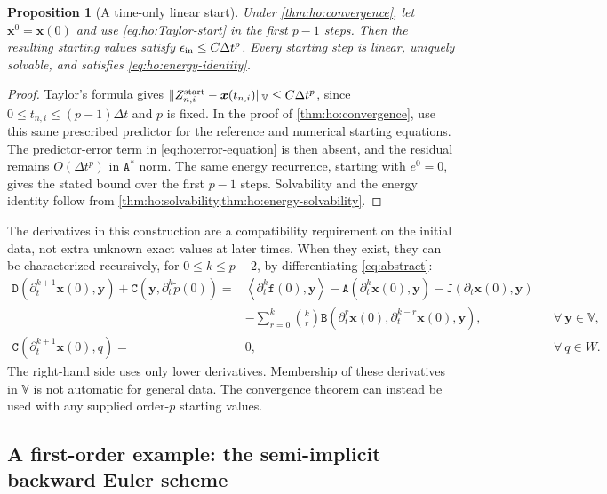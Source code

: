 \documentclass[11pt,a4paper]{article}
\newcommand{\bs}{\boldsymbol}
\newcommand{\dt}{\Delta t}
\newcommand{\V}{\mathbb V}
\newcommand{\DD}{\mathtt D}
\newcommand{\Aform}{\mathtt A}
\newcommand{\JJ}{\mathtt J}
\newcommand{\BB}{\mathtt B}
\newcommand{\CC}{\mathtt C}
\newcommand{\ff}{\mathtt f}
\newcommand{\pp}{\widetilde p}
\newcommand{\dual}[2]{\left\langle#1,#2\right\rangle}
\newtheorem{proposition}[proposition]{Proposition}
\theoremstyle{definition}
\numberwithin{equation}{section}
\begin{document}
\begin{proposition}[A time-only linear start]\label{prop:ho:time-start}
Under \cref{thm:ho:convergence}, let $\bs x^0=\bs x(0)$ and use
\eqref{eq:ho:Taylor-start} in the first $p-1$ steps. Then the resulting
starting values satisfy $\epsilon_{\rm in}\le C\dt^p$. Every starting step is
linear, uniquely solvable, and satisfies \eqref{eq:ho:energy-identity}.
\end{proposition}
\begin{proof}
Taylor's formula gives
$\|Z_{n,i}^{\rm start}-\bs x(t_{n,i})\|_{\V}\le C\dt^p$, since
$0\le t_{n,i}\le(p-1)\dt$ and $p$ is fixed. In the proof of
\cref{thm:ho:convergence}, use this same prescribed predictor for the
reference and numerical starting equations. The predictor-error term in
\eqref{eq:ho:error-equation} is then absent, and the residual remains
$O(\dt^p)$ in $\Aform^*$ norm. The same energy recurrence, starting with $e^0=0$,
gives the stated bound over the first $p-1$ steps.
Solvability and the energy identity follow from
\cref{thm:ho:solvability,thm:ho:energy-solvability}.
\end{proof}
The derivatives in this construction are a compatibility requirement on the
initial data, not extra unknown exact values at later times. When they exist,
they can be characterized recursively, for $0\le k\le p-2$, by differentiating \eqref{eq:abstract}:
\begin{equation}\label{eq:ho:initial-derivatives}
\begin{aligned}
 \DD(\partial_t^{k+1}\bs x(0),\bs y)+\CC(\bs y,\partial_t^k\pp(0))
 ={}&\dual{\partial_t^k\ff(0)}{\bs y}-\Aform(\partial_t^k\bs x(0),\bs y) - \JJ(\partial_t\bs x(0),\bs y) \\
 &-\sum_{r=0}^{k}\binom{k}{r}\BB(\partial_t^r\bs x(0),\partial_t^{k-r}\bs x(0),\bs y),& & \forall~ \bs y \in \V, \\
 \CC(\partial_t^{k+1}\bs x(0),q)={} & 0, & & \forall~q \in W.
\end{aligned}
\end{equation}
The right-hand side uses only lower derivatives. Membership of these derivatives
in $\V$ is not automatic for general data. The convergence theorem can instead
be used with any supplied order-$p$ starting values. 



\subsection{A first-order example: the semi-implicit backward Euler scheme}
\label{sec:BE}
\end{document}
